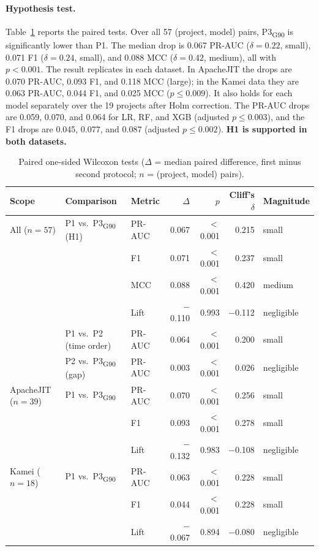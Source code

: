 \documentclass[11pt,a4paper]{article}
\newcommand{\pthree}{P3\textsubscript{G90}}
\begin{document}
\paragraph{Hypothesis test.} Table~\ref{tab:rq1tests} reports the paired tests. Over all 57 (project, model) pairs, \pthree{} is significantly lower than P1. The median drop is 0.067 PR-AUC ($\delta=0.22$, small), 0.071 F1 ($\delta=0.24$, small), and 0.088 MCC ($\delta=0.42$, medium), all with $p<0.001$. The result replicates in each dataset. In ApacheJIT the drops are 0.070 PR-AUC, 0.093 F1, and 0.118 MCC (large); in the Kamei data they are 0.063 PR-AUC, 0.044 F1, and 0.025 MCC ($p\le0.009$). It also holds for each model separately over the 19 projects after Holm correction. The PR-AUC drops are 0.059, 0.070, and 0.064 for LR, RF, and XGB (adjusted $p\le0.003$), and the F1 drops are 0.045, 0.077, and 0.087 (adjusted $p\le0.002$). \textbf{H1 is supported in both datasets.}

\begin{table}[t]
\centering
\caption{Paired one-sided Wilcoxon tests ($\Delta$ = median paired difference, first minus second protocol; $n$ = (project, model) pairs).}
\label{tab:rq1tests}
\small
\begin{tabular}{lllrrrl}
\toprule
Scope & Comparison & Metric & $\Delta$ & $p$ & Cliff's $\delta$ & Magnitude \\
\midrule
All ($n=57$) & P1 vs.\ \pthree{} (H1) & PR-AUC & 0.067 & $<$0.001 & 0.215 & small \\
             &                        & F1     & 0.071 & $<$0.001 & 0.237 & small \\
             &                        & MCC    & 0.088 & $<$0.001 & 0.420 & medium \\
             &                        & Lift   & $-$0.110 & 0.993 & $-$0.112 & negligible \\
             & P1 vs.\ P2 (time order) & PR-AUC & 0.064 & $<$0.001 & 0.200 & small \\
             & P2 vs.\ \pthree{} (gap)  & PR-AUC & 0.003 & $<$0.001 & 0.026 & negligible \\
\midrule
ApacheJIT ($n=39$) & P1 vs.\ \pthree{} & PR-AUC & 0.070 & $<$0.001 & 0.256 & small \\
                   &                   & F1     & 0.093 & $<$0.001 & 0.278 & small \\
                   &                   & Lift   & $-$0.132 & 0.983 & $-$0.108 & negligible \\
\midrule
Kamei ($n=18$) & P1 vs.\ \pthree{} & PR-AUC & 0.063 & $<$0.001 & 0.228 & small \\
               &                   & F1     & 0.044 & $<$0.001 & 0.228 & small \\
               &                   & Lift   & $-$0.067 & 0.894 & $-$0.080 & negligible \\
\bottomrule
\end{tabular}
\end{table}
\end{document}

